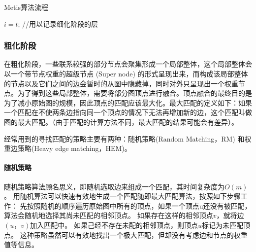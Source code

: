 \begin{algorithm}[htbp]
\caption{Metis算法流程}
\SetAlgoLined
{}


$i = t$; 	//用以记录细化阶段的层


\end{algorithm}

\subsubsection{粗化阶段}

在粗化阶段，一些联系较强的部分节点会聚集形成一个局部整体，这个局部整体会以一个带节点权重的超级节点 (Super node) 的形式呈现出来，而构成该局部整体的节点以及它们之间的边会暂时的从图中隐藏掉，同时对外只呈现出一个权重节点。为了得到这些局部整体，需要将部分图顶点进行融合。顶点融合的最终目的是为了减小原始图的规模，因此顶点的匹配应该最大化。最大匹配的定义如下：如果一个匹配在不使两条边指向同一个顶点的情况下无法再增加新的边，这个匹配叫做图的最大匹配。（由于匹配的计算方法不同，最大匹配的结果可能会有差异）。

经常用到的寻找匹配的策略主要有两种：随机策略(Random Matching，RM) 和权重边策略(Heavy edge matching，HEM)。

\paragraph{随机策略}
随机策略算法顾名思义，即随机选取边来组成一个匹配，其时间复杂度为$O(m)$。
用随机算法可以快速有效地生成一个匹配随即最大匹配算法，按照如下步骤工作：
先按照随机的顺序遍历原始图中所有的顶点，如果一个顶点u还没有被匹配，算法会随机地选择其尚未匹配的相邻顶点。
如果存在这样的相邻顶点$v$，就将边$(u，v)$加入匹配中。
如果己经不存在未配的相邻顶点，则顶点$u$标记为未匹配顶点。
这种策略虽然可以有效地找出一个极大匹配，但却没有考虑边和节点的权重值等信息。

